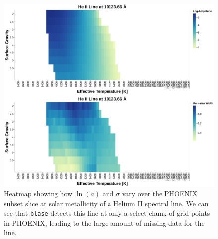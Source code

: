 \documentclass[twocolumn, linenumbers]{aastex631}
\begin{document}
\begin{figure}
    \centering
    \includegraphics[width=\textwidth]{figure4}
    \caption{Heatmap showing how $\ln(a)$ and $\sigma$ vary over the PHOENIX subset slice at solar metallicity of a Helium II spectral line.
    We can see that \texttt{blase} detects this line at only a select chunk of grid points in PHOENIX, leading to the large amount of missing data for the line.}
    \label{fig:figure4}
\end{figure}
\end{document}
